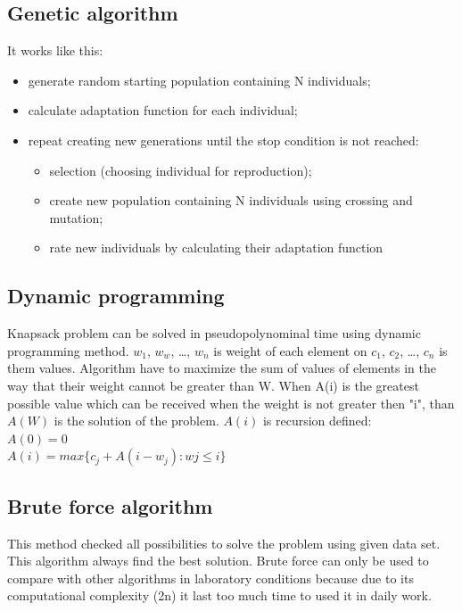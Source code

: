 \documentclass[conference,compsoc]{IEEEtran}
\begin{document}
\subsection{Genetic algorithm}
It works like this:
\begin{itemize}
\item generate random starting population containing N individuals;
\item calculate adaptation function for each individual;
\item repeat creating new generations until the stop condition is not reached:
	\begin{itemize}
	\item selection (choosing individual for reproduction);
	\item create new population containing N individuals 					using crossing and mutation;
	\item rate new individuals by calculating their 						adaptation function
	\end{itemize}
	

\end{itemize}
\subsection{Dynamic programming}
Knapsack problem can be solved in pseudopolynominal time using dynamic programming method. $w_{1}$, $w_{w}$, …, $w_{n}$ is weight of each element on $c_{1}$, $c_{2}$, …, $c_{n}$ is them values. Algorithm have to maximize the sum of values of elements in the way that their weight cannot be greater than W. When A(i) is the greatest possible value which can be received when the weight is not greater then "i", than $A(W)$ is the solution of the problem.
$A(i)$ is recursion defined:\\
$A(0) = 0$\\
$A(i) = max \{c_{j} + A(i-w_{j}): w{j}\leqslant i\}$


\subsection{Brute force algorithm}
This method checked all possibilities to solve the problem using given data set. This algorithm always find the best solution. Brute force can only be used to compare with other algorithms in laboratory conditions because due to its computational complexity (2n) it last too much time to used it in daily work. 
\end{document}
